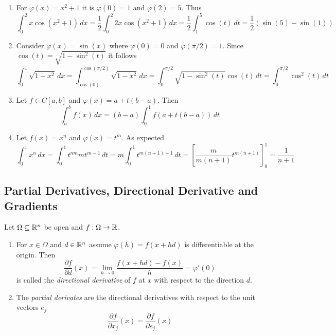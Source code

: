\begin{examples}\hfill
    \begin{enumerate}
        \item For \( \varphi(x) = x^2 + 1 \) it is \( \varphi(0) = 1 \) and \( \varphi(2) = 5 \). Thus
              \[
                  \int_0^2 x\cos(x^2 + 1)\,dx
                  = \frac{1}{2} \int_0^2 2x\cos(x^2 + 1)\,dx
                  = \frac{1}{2} \int_1^5 \cos(t)\,dt
                  = \frac{1}{2} (\sin(5) - \sin(1))
              \]
        \item Consider \( \varphi(x) = \sin(x) \) where \( \varphi(0) = 0 \) and \( \varphi(\pi / 2) = 1 \).
              Since \( \cos(t) = \sqrt{1 - \sin^2(t)} \) it follows
              \[
                  \int_0^1 \sqrt{1 - x^2}\,dx
                  = \int_{\cos(0)}^{\cos(\pi/2)} \sqrt{1 - x^2}\,dx
                  = \int_0^{\pi/2} \sqrt{1 - \sin^2(t)}\cos(t)\,dt
                  = \int_0^{\pi/2} \cos^2(t)\,dt
              \]
        \item Let \(f \in C[a,b] \) and \( \varphi(x) = a + t(b - a) \). Then
              \[
                  \int_a^b f(x)\,dx = (b - a)\int_0^1 f(a + t(b - a))\,dt
              \]
        \item Let \(f(x) = x^n \) and \( \varphi(x) = t^m \). As expected
              \[
                  \int_0^1 x^n\,dx
                  = \int_0^1 t^{nm} m t^{m - 1}\,dt
                  = m\int_0^1 t^{m(n + 1) - 1}\,dt
                      = {\left[\frac{m}{m(n + 1)} t^{m(n + 1)}\right]}_0^1
                  = \frac{1}{n + 1}
              \]
    \end{enumerate}
\end{examples}
\bigskip


\subsection{Partial Derivatives, Directional Derivative and Gradients}
\bigskip

\begin{definition}
    Let \( \Omega \subseteq \mathbb{R}^n \) be open and \( f : \Omega \to \mathbb{R} \).
    \begin{enumerate}
        \item For \( x \in \Omega \) and \( d \in \mathbb{R}^n \) assume \( \varphi(h) = f(x + hd) \) is differentiable
              at the origin. Then
              \[
                  \frac{\partial f}{\partial d}(x) = \lim_{h \to 0} \frac{f(x + hd) - f(x)}{h} = \varphi'(0)
              \]
              is called the \emph{directional derivative} of \( f \) at \( x \) with respect to the direction \( d \).
        \item The \emph{partial derivates} are the directional derivatives with respect to the
              unit vectors \( e_j \)
              \[
                  \frac{\partial f}{\partial x_j}(x) = \frac{\partial f}{\partial e_j}(x)
              \]
    \end{enumerate}
\end{definition}
\bigskip


